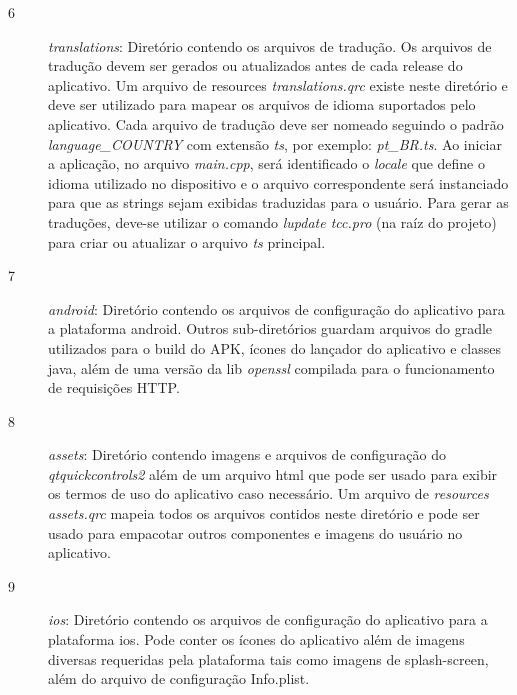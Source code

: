 \begin{description}
	\item[6] \textit{translations}: Diretório contendo os arquivos de tradução. Os arquivos de tradução devem ser gerados ou atualizados antes de cada release do aplicativo. Um arquivo de resources \textit{translations.qrc} existe neste diretório e deve ser utilizado para mapear os arquivos de idioma suportados pelo aplicativo. Cada arquivo de tradução deve ser nomeado seguindo o padrão \textit{language\_COUNTRY} com extensão \textit{ts}, por exemplo: \textit{pt\_BR.ts}. Ao iniciar a aplicação, no arquivo \textit{main.cpp}, será identificado o \textit{locale} que define o idioma utilizado no dispositivo e o arquivo correspondente será instanciado para que as strings sejam exibidas traduzidas para o usuário. Para gerar as traduções, deve-se utilizar o comando \textit{lupdate tcc.pro} (na raíz do projeto) para criar ou atualizar o arquivo \textit{ts} principal.

	\item[7] \textit{android}: Diretório contendo os arquivos de configuração do aplicativo para a plataforma android. Outros sub-diretórios guardam arquivos do gradle utilizados para o build do APK, ícones do lançador do aplicativo e classes java, além de uma versão da lib \textit{openssl} compilada para o funcionamento de requisições HTTP.

	\item[8] \textit{assets}: Diretório contendo imagens e arquivos de configuração do \textit{qtquickcontrols2} além de um arquivo html que pode ser usado para exibir os termos de uso do aplicativo caso necessário. Um arquivo de \textit{resources} \textit{assets.qrc} mapeia todos os arquivos contidos neste diretório e pode ser usado para empacotar outros componentes e imagens do usuário no aplicativo.

	\item[9] \textit{ios}: Diretório contendo os arquivos de configuração do aplicativo para a plataforma ios. Pode conter os ícones do aplicativo além de imagens diversas requeridas pela plataforma tais como imagens de splash-screen, além do arquivo de configuração Info.plist.
\end{description}


